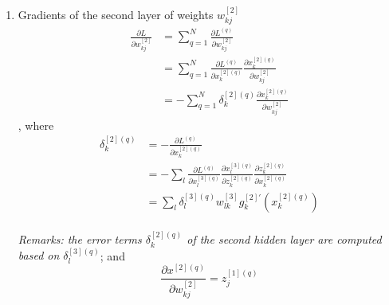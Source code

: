 \documentclass[11pt]{article}
\newcommand\pddx[2]{\frac{\partial{#1}}{\partial{#2}}}
\begin{document}
\begin{enumerate}
\begin{enumerate}
\item Gradients of the second layer of weights $w_{kj}^{[2]}$
\begin{align*}
\pddx{L}{w_{kj}^{[2]}} &= \sum_{q=1}^{N} \pddx{L^{(q)}}{w_{kj}^{[2]}}\\
&= \sum_{q=1}^{N} \pddx{L^{(q)}}{x_k ^{[2](q)}}\pddx{x_k ^{[2](q)}}{w_{kj}^{[2]}}\\
&= - \sum_{q=1}^{N} \delta^{[2](q)}_k \pddx{x_k ^{[2](q)}}{w_{kj}^{[2]}}
\end{align*}, where \begin{align*}
\delta^{[2](q)}_k &= - \pddx{L^{(q)}}{x^{[2](q)}_k}\\
&= - \sum_{l} \pddx{L^{(q)}}{x^{[3](q)}_l} \pddx{x^{[3](q)}_l}{z^{[2](q)}_k} \pddx{z^{[2](q)}_k}{x^{[2](q)}_k}\\
&= \sum_{l} \delta^{[3](q)}_l w^{[3]}_{lk} g^{[2]'}_k (x^{[2](q)}_k)
\end{align*}\\ \textit{Remarks: the error terms $\delta_{k}^{[2](q)}$ of the second hidden layer are computed based on $\delta^{[3](q)}_l$}; and $$\pddx{x^{[2](q)}}{w^{[2]}_{kj}} = z_{j}^{[1](q)}$$


\end{enumerate}
\end{enumerate}
\end{document}
